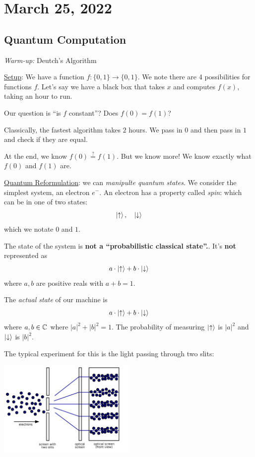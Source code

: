\section{March 25, 2022}
\subsection{Quantum Computation}
\emph{Warm-up:} Deutch's Algorithm

\ul{Setup}: We have a function $f : \{0, 1\}\to \{0, 1\}$. We note there are 4 possibilities for functions $f$. Let's say we have a black box that takes $x$ and computes $f(x)$, taking an hour to run.

Our question is ``is $f$ constant''? Does $f(0) = f(1)$?

Classically, the fastest algorithm takes $2$ hours. We pass in $0$ and then pass in $1$ and check if they are equal.

At the end, we know $f(0) \overset{?}{=} f(1)$. But we know more! We know exactly what $f(0)$ and $f(1)$ are.

\ul{Quantum Reformulation}: we can \emph{manipulte quantum states}. We consider the simplest system, an electron $e^-$. An electron has a property called \emph{spin}: which can be in one of two states:
\[\Ket{\uparrow}, \quad \Ket{\downarrow}\]
which we notate $0$ and $1$.

\begin{remark*}
    The state of the system is \textbf{not a ``probabilistic classical state''.}. It's \textbf{not} represented as
    \[a\cdot \Ket{\uparrow} + b\cdot \Ket{\downarrow}\]
    where $a, b$ are positive reals with $a + b = 1$.
\end{remark*}

The \emph{actual state} of our machine is
\[a\cdot \Ket{\uparrow} + b\cdot \Ket{\downarrow}\]
where $a, b\in\mathbb C$ where $|a|^2 + |b|^2 = 1$. The probability of measuring $\Ket{\uparrow}$ is $|a|^2$ and $\Ket{\downarrow}$ is $|b|^2$.

\begin{example}
    The typical experiment for this is the light passing through two slits:
    \begin{center}
        \includegraphics[width=0.5\textwidth]{images/slit-experiment.png}
    \end{center}
\end{example}

